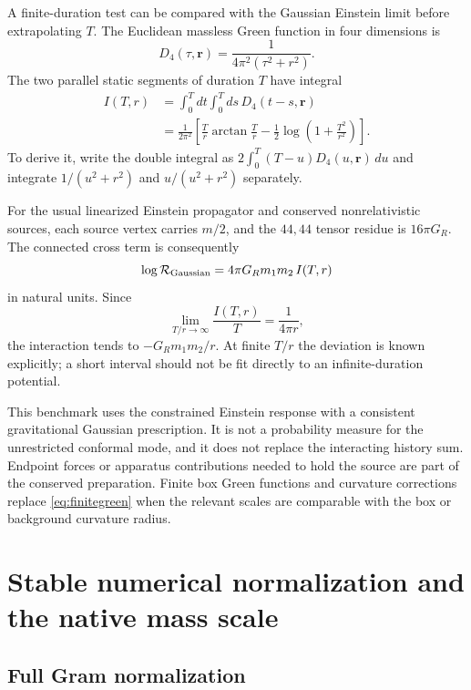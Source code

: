 A finite-duration test can be compared with the Gaussian Einstein limit before extrapolating $T$. The Euclidean massless Green function in four dimensions is
\begin{equation}
D_4(\tau,\mathbf r)=\frac1{4\pi^2(\tau^2+r^2)}.
\end{equation}
The two parallel static segments of duration $T$ have integral
\begin{align}
I(T,r)
&=\int_0^Tdt\int_0^Tds\,D_4(t-s,\mathbf r)\\
&=\frac1{2\pi^2}
\left[\frac{T}{r}\arctan\frac{T}{r}
-\frac12\log\left(1+\frac{T^2}{r^2}\right)\right].
\label{eq:finitegreen}
\end{align}
To derive it, write the double integral as
$2\int_0^T(T-u)D_4(u,\mathbf r)\,du$ and integrate
$1/(u^2+r^2)$ and $u/(u^2+r^2)$ separately.

For the usual linearized Einstein propagator and conserved nonrelativistic sources, each source vertex carries $m/2$, and the $44,44$ tensor residue is $16\pi G_R$. The connected cross term is consequently
\begin{equation}
\log\mathcal R_{\rm Gaussian}=4\pi G_Rm_1m_2\,I(T,r)
\end{equation}
in natural units. Since
\begin{equation}
\lim_{T/r\to\infty}\frac{I(T,r)}T=\frac1{4\pi r},
\end{equation}
the interaction tends to $-G_Rm_1m_2/r$.
At finite $T/r$ the deviation is known explicitly; a short interval should not be fit directly to an infinite-duration potential.

This benchmark uses the constrained Einstein response with a consistent gravitational Gaussian prescription. It is not a probability measure for the unrestricted conformal mode, and it does not replace the interacting history sum. Endpoint forces or apparatus contributions needed to hold the source are part of the conserved preparation. Finite box Green functions and curvature corrections replace \eqref{eq:finitegreen} when the relevant scales are comparable with the box or background curvature radius.

\section{Stable numerical normalization and the native mass scale}
\label{app:numerics}

\subsection{Full Gram normalization}

